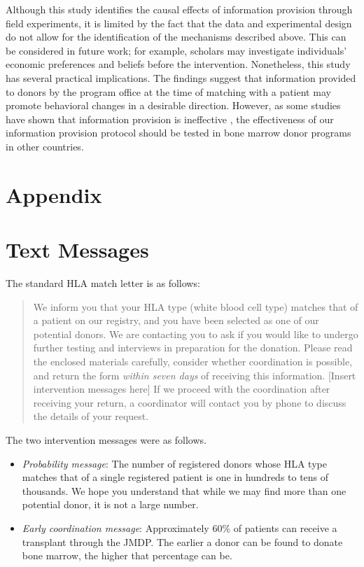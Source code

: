 \documentclass[12pt, a4paper]{article}
\providecommand{\tightlist}{%
  \setlength{\itemsep}{0pt}\setlength{\parskip}{0pt}}
\begin{document}
Although this study identifies the causal effects of information provision through field experiments, it is limited by the fact that the data and experimental design do not allow for the identification of the mechanisms described above. This can be considered in future work; for example, scholars may investigate individuals' economic preferences and beliefs before the intervention. Nonetheless, this study has several practical implications. The findings suggest that information provided to donors by the program office at the time of matching with a patient may promote behavioral changes in a desirable direction. However, as some studies have shown that information provision is ineffective \citep[for example,][]{Switzer2018}, the effectiveness of our information provision protocol should be tested in bone marrow donor programs in other countries.

\clearpage

\appendix

\hypertarget{appendix}{%
\section*{Appendix}\label{appendix}}

\hypertarget{message}{%
\section{Text Messages}\label{message}}

The standard HLA match letter is as follows:

\begin{quote}
We inform you that your HLA type (white blood cell type) matches that of a patient on our registry, and you have been selected as one of our potential donors. We are contacting you to ask if you would like to undergo further testing and interviews in preparation for the donation. Please read the enclosed materials carefully, consider whether coordination is possible, and return the form \emph{within seven days} of receiving this information. {[}Insert intervention messages here{]} If we proceed with the coordination after receiving your return, a coordinator will contact you by phone to discuss the details of your request.
\end{quote}

The two intervention messages were as follows.

\begin{itemize}
\tightlist
\item
  \emph{Probability message}: The number of registered donors whose HLA type matches that of a single registered patient is one in hundreds to tens of thousands. We hope you understand that while we may find more than one potential donor, it is not a large number.
\item
  \emph{Early coordination message}: Approximately 60\% of patients can receive a transplant through the JMDP. The earlier a donor can be found to donate bone marrow, the higher that percentage can be.
\end{itemize}

\clearpage


\end{document}
